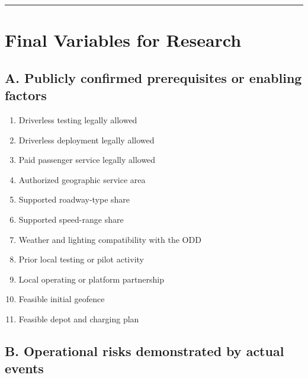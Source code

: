 \documentclass[10pt,a4paper]{article}
\providecommand{\tightlist}{\setlength{\itemsep}{0pt}\setlength{\parskip}{0pt}}
\begin{document}
\begin{center}\rule{0.5\linewidth}{0.5pt}\end{center}

\hypertarget{final-variables-for-research}{%
\section{Final Variables for Research}\label{final-variables-for-research}}

\hypertarget{a.-publicly-confirmed-prerequisites-or-enabling-factors}{%
\subsection{A. Publicly confirmed prerequisites or enabling factors}\label{a.-publicly-confirmed-prerequisites-or-enabling-factors}}

\begin{enumerate}
\def\labelenumi{\arabic{enumi}.}
\tightlist
\item
  Driverless testing legally allowed\\
\item
  Driverless deployment legally allowed\\
\item
  Paid passenger service legally allowed\\
\item
  Authorized geographic service area\\
\item
  Supported roadway-type share\\
\item
  Supported speed-range share\\
\item
  Weather and lighting compatibility with the ODD\\
\item
  Prior local testing or pilot activity\\
\item
  Local operating or platform partnership\\
\item
  Feasible initial geofence\\
\item
  Feasible depot and charging plan
\end{enumerate}

\hypertarget{b.-operational-risks-demonstrated-by-actual-events}{%
\subsection{B. Operational risks demonstrated by actual events}\label{b.-operational-risks-demonstrated-by-actual-events}}
\end{document}
